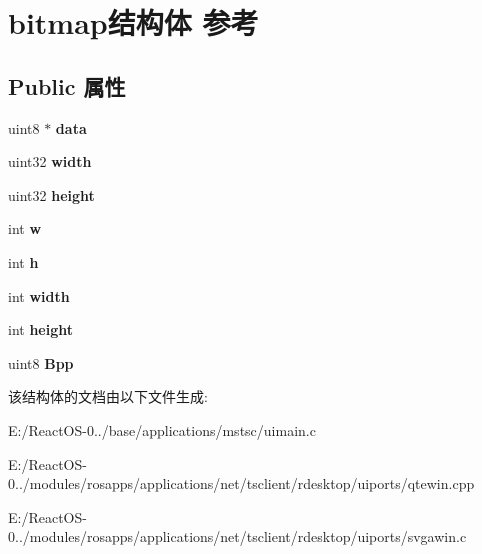 \hypertarget{structbitmap}{}\section{bitmap结构体 参考}
\label{structbitmap}
\subsection*{Public 属性}
\begin{DoxyCompactItemize}
\item 
\mbox{\label{structbitmap_a5c64f3098ba003db5a9373fa7ae83a84}} 
uint8 $\ast$ {\bfseries data}
\item 
\mbox{\label{structbitmap_ade835d3628eda4ec126826dc8209fcb0}} 
uint32 {\bfseries width}
\item 
\mbox{\label{structbitmap_afb56062486201f66c1057d263e886ffc}} 
uint32 {\bfseries height}
\item 
\mbox{\label{structbitmap_a78828f6962572022487a8c3ee99cee88}} 
int {\bfseries w}
\item 
\mbox{\label{structbitmap_a1c0ad02e5bbc3a754d6bb12126e43f17}} 
int {\bfseries h}
\item 
\mbox{\label{structbitmap_a4ce73692bd5429f0dc54e2b542af9270}} 
int {\bfseries width}
\item 
\mbox{\label{structbitmap_a6e2342e52df0eb9e5048f85515498adf}} 
int {\bfseries height}
\item 
\mbox{\label{structbitmap_a0c4b686bb232cd30f87a4b8a3b4d587d}} 
uint8 {\bfseries Bpp}
\end{DoxyCompactItemize}


该结构体的文档由以下文件生成\+:\begin{DoxyCompactItemize}
\item 
E\+:/\+React\+O\+S-\/0../base/applications/mstsc/uimain.\+c\item 
E\+:/\+React\+O\+S-\/0../modules/rosapps/applications/net/tsclient/rdesktop/uiports/qtewin.\+cpp\item 
E\+:/\+React\+O\+S-\/0../modules/rosapps/applications/net/tsclient/rdesktop/uiports/svgawin.\+c\end{DoxyCompactItemize}
